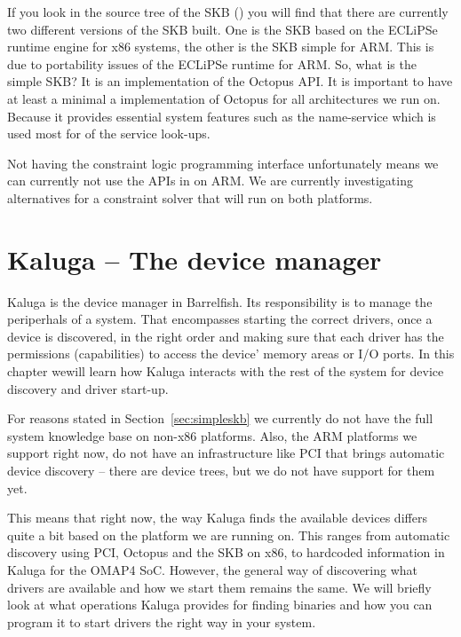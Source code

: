 \documentclass[a4paper,11pt,twoside]{report}
\begin{document}
If you look in the source tree of the SKB () you will find
that there are currently two different versions of the SKB built. One is the
SKB based on the ECLiPSe runtime engine for x86 systems, the other is the SKB
simple for ARM. This is due to portability issues of the ECLiPSe runtime for
ARM. So, what is the simple SKB? It is an implementation of the Octopus API.
It is important to have at least a minimal a implementation of Octopus for all
architectures we run on. Because it provides essential system features such as
the name-service which is used most for of the service look-ups.

Not having the constraint logic programming interface unfortunately means we
can currently not use the APIs in  on ARM. We are currently
investigating alternatives for a constraint solver that will run on both
platforms.

\chapter{Kaluga -- The device manager}


Kaluga is the device manager in Barrelfish. Its responsibility is to manage
the periperhals of a system. That encompasses starting the correct drivers,
once a device is discovered, in the right order and making sure that each driver
has the permissions (capabilities) to access the device' memory areas
or I/O ports. In this chapter wewill learn how Kaluga interacts with the
rest of the system for device discovery and driver start-up.

For reasons stated in Section~\ref{sec:simpleskb} we currently do not have the
full system knowledge base on non-x86 platforms. Also, the ARM platforms we
support right now, do not have an infrastructure like PCI that brings
automatic device discovery -- there are device trees, but we do not
have support for them yet.

This means that right now, the way Kaluga finds the available devices differs
quite a bit based on the platform we are running on. This ranges from
automatic discovery using PCI, Octopus and the SKB on x86, to hardcoded
information in Kaluga for the OMAP4 SoC. However, the general way of
discovering what drivers are available and how we start them remains the same.
We will briefly look at what operations Kaluga provides for finding binaries
and how you can program it to start drivers the right way in your system.
\end{document}
